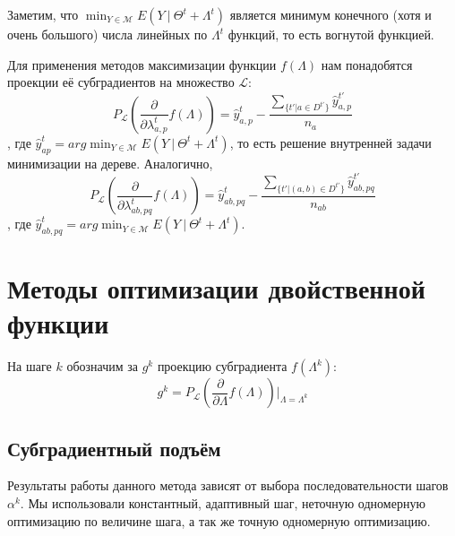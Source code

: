 \documentclass{article}
\begin{document}
Заметим, что $\min_{Y \in \mathcal{M}} E(Y~|~\Theta^t + \Lambda^t)$ является минимум конечного (хотя и очень большого) числа линейных по $\Lambda^t$ функций, то есть вогнутой функцией.

Для применения методов максимизации функции $f(\Lambda)$ нам понадобятся проекции её субградиентов на множество $\mathcal{L}$:\\
\begin{equation}
P_{\mathcal{L}} \left( \frac{\partial}{\partial \lambda_{a,p}^t} f(\Lambda) \right ) = \widehat{y}_{a,p}^t - \frac{\sum_{\{t' | a \in D^{t'}\}} \widehat{y}_{a,p}^{t'}}{n_a}
\end{equation}
, где $\widehat{y}_{ap}^t = arg\min_{Y \in \mathcal{M}} E(Y~|~\Theta^t + \Lambda^t)$, то есть решение внутренней задачи минимизации на дереве. Аналогично,
\begin{equation}
P_{\mathcal{L}} \left( \frac{\partial}{\partial \lambda_{ab,pq}^t} f(\Lambda) \right ) = \widehat{y}_{ab,pq}^t - \frac{\sum_{\{t' | (a,b) \in D^{t'}\}} \widehat{y}_{ab,pq}^{t'}}{n_{ab}}
\end{equation}
, где $\widehat{y}_{ab,pq}^t = arg\min_{Y \in \mathcal{M}} E(Y~|~\Theta^t + \Lambda^t)$.

\section{Методы оптимизации двойственной функции}
На шаге $k$ обозначим за $g^k$ проекцию субградиента $f(\Lambda^k)$:
\begin{equation}
g^k = P_{\mathcal{L}} \left( \frac{\partial}{\partial \Lambda} f(\Lambda) \right ) \bigg|_{\Lambda = \Lambda^k}
\end{equation}

\subsection{Субградиентный подъём}
Результаты работы данного метода зависят от выбора
последовательности шагов $\alpha^k$.
Мы использовали константный, адаптивный шаг, неточную
одномерную оптимизацию по величине шага, а так же
точную одномерную оптимизацию.\\
\end{document}
